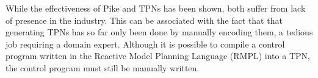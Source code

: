 While the effectiveness of Pike and TPNs has been shown, both suffer from lack of presence in the industry. This can be associated with the fact that that generating TPNs has so far only been done by manually encoding them, a tedious job requiring a domain expert.
Although it is possible to compile a control program written in the Reactive Model Planning Language (RMPL) \cite{ingham2001reactive} into a TPN, the control program must still be manually written.


